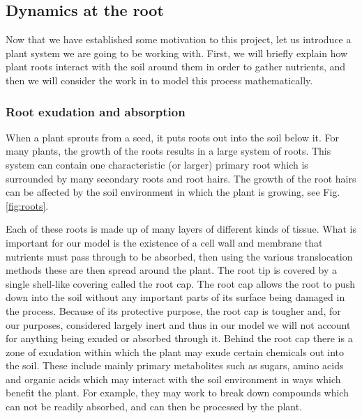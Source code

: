 \documentclass[11pt]{article}
\begin{document}
\subsection{Dynamics at the root}
Now that we have established some motivation to this project, let us introduce a plant system we are going to be working with. First, we will briefly explain how plant roots interact with the soil around them in order to gather nutrients, and then we will consider the work in \cite{Ptashnyk-2011} to model this process mathematically.
 

\subsubsection{Root exudation and absorption}
When a plant sprouts from a seed, it puts roots out into the soil below it. For many plants, the growth of the roots results in a large system of roots. This system can contain one characteristic (or larger) primary root which is surrounded by many secondary roots and root hairs. The growth of the root hairs can be affected by the soil environment in which the plant is growing, see Fig. \ref{fig:roots}.


Each of these roots is made up of many layers of different kinds of tissue. What is important for our model is the existence of a cell wall and membrane that nutrients must pass through to be absorbed, then using the various translocation methods these are then spread around the plant. The root tip is covered by a single shell-like covering called the root cap. The root cap allows the root to push down into the soil without any important parts of its surface being damaged in the process. Because of its protective purpose, the root cap is tougher and, for our purposes, considered largely inert and thus in our model we will not account for anything being exuded or absorbed through it. Behind the root cap there is a zone of exudation within which the plant may exude certain chemicals out into the soil. These include mainly primary metabolites such as sugars, amino acids and organic acids which may interact with the soil environment in ways which benefit the plant. For example, they may work to break down compounds which can not be readily absorbed, and can then be processed by the plant. 
\end{document}
